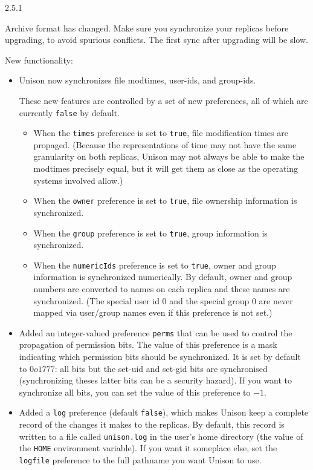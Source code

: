 \begin{changesfromversion}{2.5.1}
\item \incompatible{} Archive format has changed.  Make sure you
synchronize your replicas before upgrading, to avoid spurious
conflicts.  The first sync after upgrading will be slow.

\item New functionality:
\begin{itemize}
\item Unison now synchronizes file modtimes, user-ids, and group-ids.  

These new features are controlled by a set of new preferences, all of
which are currently \verb|false| by default.  

\begin{itemize}
\item When the \verb|times| preference is set to \verb|true|, file
modification times are propaged.  (Because the representations of time
may not have the same granularity on both replicas, Unison may not always
be able to make the modtimes precisely equal, but it will get them as
close as the operating systems involved allow.)
\item When the \verb|owner| preference is set to \verb|true|, file
ownership information is synchronized.
\item When the \verb|group| preference is set to \verb|true|, group 
information is synchronized.
\item When the \verb|numericIds| preference is set to \verb|true|, owner
and group information is synchronized numerically.  By default, owner and
group numbers are converted to names on each replica and these names are
synchronized.  (The special user id 0 and the special group 0 are never
mapped via user/group names even if this preference is not set.)
\end{itemize}

\item Added an integer-valued preference \verb|perms| that can be used to
control the propagation of permission bits.  The value of this preference
is a mask indicating which permission bits should be synchronized.  It is
set by default to $0o1777$: all bits but the set-uid and set-gid bits are
synchronised (synchronizing theses latter bits can be a security hazard).
If you want to synchronize all bits, you can set the value of this
preference to $-1$.

\item Added a \verb|log| preference (default \verb|false|), which makes
Unison keep a complete record of the changes it makes to the replicas.
By default, this record is written to a file called \verb|unison.log| in
the user's home directory (the value of the \verb|HOME| environment
variable).  If you want it someplace else, set the \verb|logfile|
preference to the full pathname you want Unison to use.


\end{itemize}
\end{changesfromversion}
